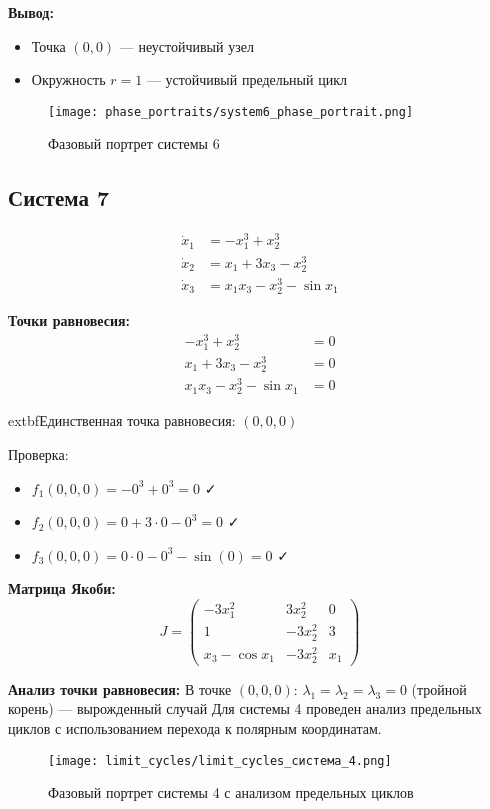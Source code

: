 \textbf{Вывод:}
\begin{itemize}
\item Точка $(0,0)$ --- неустойчивый узел
\item Окружность $r = 1$ --- устойчивый предельный цикл
\end{itemize}

\begin{figure}[H]
\centering
\texttt{[image: phase\_portraits/system6\_phase\_portrait.png]}
\caption{Фазовый портрет системы 6}
\label{fig:system6_phase_portrait}
\end{figure}

\subsection*{Система 7}

\begin{align}
\dot{x}_1 &= -x_1^3 + x_2^3 \\
\dot{x}_2 &= x_1 + 3x_3 - x_2^3 \\
\dot{x}_3 &= x_1 x_3 - x_2^3 - \sin x_1
\end{align}

\textbf{Точки равновесия:}
\begin{align}
-x_1^3 + x_2^3 &= 0 \\
x_1 + 3x_3 - x_2^3 &= 0 \\
x_1 x_3 - x_2^3 - \sin x_1 &= 0
\end{align}

	extbf{Единственная точка равновесия:} $(0, 0, 0)$

Проверка:
\begin{itemize}
\item $f_1(0,0,0) = -0^3 + 0^3 = 0$ ✓
\item $f_2(0,0,0) = 0 + 3 \cdot 0 - 0^3 = 0$ ✓
\item $f_3(0,0,0) = 0 \cdot 0 - 0^3 - \sin(0) = 0$ ✓
\end{itemize}

\textbf{Матрица Якоби:}
$$J = \begin{pmatrix} 
-3x_1^2 & 3x_2^2 & 0 \\
1 & -3x_2^2 & 3 \\
x_3 - \cos x_1 & -3x_2^2 & x_1
\end{pmatrix}$$

\textbf{Анализ точки равновесия:}
В точке $(0, 0, 0)$:
$\lambda_1 = \lambda_2 = \lambda_3 = 0$ (тройной корень) --- вырожденный случай
Для системы 4 проведен анализ предельных циклов с использованием перехода к полярным координатам.


\begin{figure}[H]
\centering
\texttt{[image: limit\_cycles/limit\_cycles\_система\_4.png]}
\caption{Фазовый портрет системы 4 с анализом предельных циклов}
\label{fig:limit_cycles_system4}
\end{figure}

